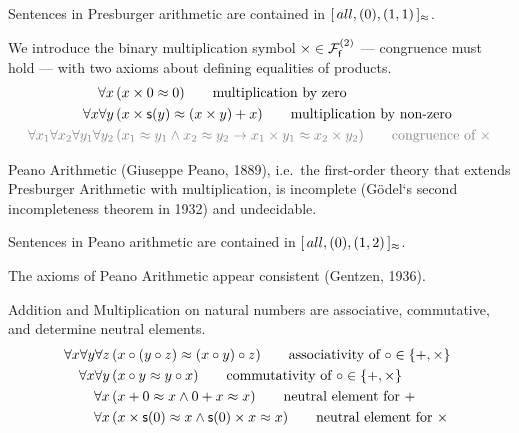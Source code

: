 \begin{remark}
	Sentences in Presburger arithmetic are contained in
	\( [ \, all , (0), (1,1) \, ]{}_{\mEQ} \).
\end{remark}

\begin{definition}
	[Multiplication]\label{tab:addition:axioms}
	We introduce the binary multiplication symbol \( \times\in\mcFfn[2] \)
	--- congruence must hold ---
	with two axioms about defining equalities of products.
	\begin{align*}
	\forall x\,
	&(x\times 0 \mEQ 0)
	\tag*{multiplication by zero}\\
	\forall x\forall y\,
	&(x\times\msucc(y) \mEQ (x\times y) + x)
	\tag*{multiplication by non-zero}
	\\
	\colG\forall x_1\forall x_2\forall y_1\forall y_2\,
	&\colG (x_1\mEQ y_1\land x_2\mEQ y_2 \limp x_1\times y_1\mEQ x_2 \times y_2)
	\tag*{congruence of \( \times \)}
	\end{align*}
\end{definition}

\begin{theorem}Peano Arithmetic (Giuseppe Peano, 1889),
	i.e.\ the first-order theory that extends Presburger Arithmetic with multiplication, is incomplete (Gödel`s second incompleteness theorem in 1932) and undecidable.
\end{theorem}

\begin{remark}
	Sentences in Peano arithmetic are contained in
	\( [ \, all , (0), (1,2) \, ]{}_{\mEQ} \).
\end{remark}

\begin{theorem}
	The axioms of Peano Arithmetic appear consistent (Gentzen, 1936).
\end{theorem}

\begin{lemma}[ACN]\label{lem:acn}
	Addition and Multiplication on natural numbers are associative, commutative,
	and determine neutral elements.
	\begin{align*}
	\forall x\forall y\forall z\,&(x\circ(y\circ z) \mEQ (x\circ y)\circ z)
	\tag*{associativity of \( \circ\in \{ +,\times \} \) }
	\\
	\forall x\forall y\,&(x\circ y \mEQ y\circ x)
	\tag*{commutativity of \( \circ\in \{ +, \times \} \)}
	\\
	\forall x\,&(x + 0\mEQ x \land 0 + x \mEQ x )
	\tag*{neutral element for \( + \)}
	\\
	\forall x\,&(x \times \msucc(0)\mEQ x \land \msucc(0) \times x \mEQ x )
	\tag*{neutral element for \( \times \)}
	\end{align*}
\end{lemma}

